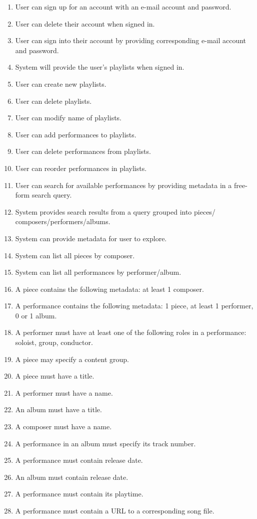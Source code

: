 \begin{enumerate}
    \item User can sign up for an account with an e-mail account and password.
    \item User can delete their account when signed in.
    \item User can sign into their account by providing corresponding e-mail
        account and password.
    \item System will provide the user's playlists when signed in.
    \item User can create new playlists.
    \item User can delete playlists.
    \item User can modify name of playlists.
    \item User can add performances to playlists.
    \item User can delete performances from playlists.
    \item User can reorder performances in playlists.
    \item User can search for available performances by providing metadata in a
        free-form search query.
    \item System provides search results from a query grouped into pieces/
        composers/performers/albums.
    \item System can provide metadata for user to explore.
    \item System can list all pieces by composer.
    \item System can list all performances by performer/album.
    \item A piece contains the following metadata: at least 1 composer.
    \item A performance contains the following metadata: 1 piece,
        at least 1 performer, 0 or 1 album.
    \item A performer must have at least one of the following roles in a
        performance: soloist, group, conductor.
    \item A piece may specify a content group.
    \item A piece must have a title.
    \item A performer must have a name. 
    \item An album must have a title.
    \item A composer must have a name.
    \item A performance in an album must specify its track number.
    \item A performance must contain release date.
    \item An album must contain release date.
    \item A performance must contain its playtime.
    \item A performance must contain a URL to a corresponding song file.
\end{enumerate}
